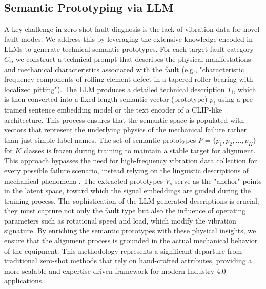 \subsection{Semantic Prototyping via LLM}
A key challenge in zero-shot fault diagnosis is the lack of vibration data for novel fault modes. We address this by leveraging the extensive knowledge encoded in LLMs to generate technical semantic prototypes. For each target fault category $C_i$, we construct a technical prompt that describes the physical manifestations and mechanical characteristics associated with the fault (e.g., "characteristic frequency components of rolling element defect in a tapered roller bearing with localized pitting"). The LLM produces a detailed technical description $T_i$, which is then converted into a fixed-length semantic vector (prototype) $p_i$ using a pre-trained sentence embedding model or the text encoder of a CLIP-like architecture. This process ensures that the semantic space is populated with vectors that represent the underlying physics of the mechanical failure rather than just simple label names. The set of semantic prototypes $P = \{p_1, p_2, \dots, p_K\}$ for $K$ classes is frozen during training to maintain a stable target for alignment. This approach bypasses the need for high-frequency vibration data collection for every possible failure scenario, instead relying on the linguistic descriptions of mechanical phenomena \cite{radford2021learning, brown2020language}. The extracted prototypes $V_s$ serve as the "anchor" points in the latent space, toward which the signal embeddings are guided during the training process. The sophistication of the LLM-generated descriptions is crucial; they must capture not only the fault type but also the influence of operating parameters such as rotational speed and load, which modify the vibration signature. By enriching the semantic prototypes with these physical insights, we ensure that the alignment process is grounded in the actual mechanical behavior of the equipment. This methodology represents a significant departure from traditional zero-shot methods that rely on hand-crafted attributes, providing a more scalable and expertise-driven framework for modern Industry 4.0 applications.

